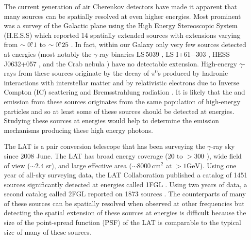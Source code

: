 \documentclass[12pt,preprint]{aastex}
\newcommand{\mev}{\text{MeV}\xspace}
\newcommand{\gev}{\text{GeV}\xspace}
\newcommand{\tev}{\text{TeV}\xspace}
\newcommand{\cm}{\text{cm}\xspace}
\begin{document}
The current generation of air Cherenkov detectors have
made it apparent that many sources can be spatially resolved
at even higher energies.
Most
prominent was a survey of the Galactic plane using the High Energy
Stereoscopic System (H.E.S.S) which reported 14 spatially extended
sources with extensions varying from $\sim0\mbox{$.\!\!^\circ$}1$ to $\sim0\mbox{$.\!\!^\circ$}25$
\citep{hess_plane_survey}.  In fact, within our Galaxy only very few
sources detected at \tev energies (most notably the $\gamma$-ray binaries
LS\,5039 \citep{HESSLS5039}, LS I+61$-$303 \citep{MAGICLSI, VERITASLSI},
HESS\,J0632+057 \citep{HESS0632}, and the Crab nebula \citep{crab_weekes})
have no detectable extension.  High-energy $\gamma$-rays from
these sources originate by the decay of $\pi^0$s produced by hadronic
interactions with interstellar matter and by relativistic electrons
due to Inverse Compton (IC) scattering and Bremsstrahlung radiation
\citep{blandford_and_eichler_1987}.  It is likely that the \gev and
\tev emission from these sources originates from the same population of
high-energy particles and so at least some of these sources should be
detected at \gev energies.  Studying 
these \tev sources at \gev energies would help to
determine the emission mechanisms producing these high energy photons.

The LAT is a pair conversion telescope that has been surveying the
$\gamma$-ray sky since 2008 June.  The LAT has broad energy coverage
(20 \mev to $>300$ \gev), wide field of view ($\sim 2.4$ sr), and large
effective area ($\sim 8000\ \cm^2$ at $>1 \gev$).  
Using one year of all-sky surveying data, the LAT Collaboration published
a catalog of 1451 sources significantly detected at \gev energies called 1FGL \citep{first_cat}.
Using two years of data, a second catalog called 2FGL reported on 1873
sources \citep{second_cat}.
The counterparts of many of these sources can be spatially resolved
when observed at other frequencies but detecting the spatial extension
of these sources at \gev energies is difficult because the size of the
point-spread function (PSF) of the LAT is comparable to the typical size
of many of these sources.
\end{document}
